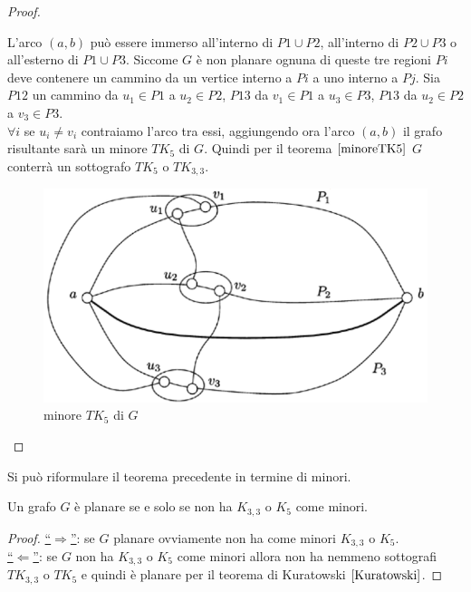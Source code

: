 \begin{teorema}
\begin{proof}
\begin{enumerate}
            L'arco \((a,b)\) può essere immerso all'interno di \(P1 \cup P2\), all'interno di \(P2 \cup P3\) o all'esterno di \(P1 \cup P3\). Siccome \(G\) è non planare ognuna di queste tre regioni \(Pi\) deve contenere un cammino da un vertice interno a \(Pi\) a uno interno a \(Pj\). Sia \(P12\) un cammino da \(u_1 \in P1\) a \(u_2 \in P2\), \(P13\) da \(v_1 \in P1\) a \(u_3 \in P3\), \(P13\) da \(u_2 \in P2\) a \(v_3 \in P3\).\\
            \(\forall i\) se \(u_i \neq v_i\) contraiamo l'arco tra essi, aggiungendo ora l'arco \((a,b)\) il grafo risultante sarà un minore \(TK_5\) di \(G\). Quindi per il teorema \(\ref{minoreTK5}\) \(G\) conterrà un sottografo \(TK_5\) o \(TK_{3,3}\).
            \begin{figure}[H]
                \centering
                \includegraphics[scale=0.6]{img/minoreTK5.PNG}
                \caption{minore \(TK_5\) di \(G\)}
            \end{figure}
        \end{enumerate}
    \end{proof}
\end{teorema}
\noindent Si può riformulare il teorema precedente in termine di minori.
\begin{teorema}
    Un grafo \(G\) è planare se e solo se non ha \(K_{3,3}\) o \(K_5\) come minori.
    \begin{proof}
        \underline{“\(\Rightarrow\)”}: se \(G\) planare ovviamente non ha come minori \(K_{3,3}\) o \(K_5\). \\
        \underline{“\(\Leftarrow\)”}: se \(G\) non ha \(K_{3,3}\) o \(K_5\) come minori allora non ha nemmeno sottografi \(TK_{3,3}\) o \(TK_5\) e quindi è planare per il teorema di Kuratowski \(\ref{Kuratowski}\).
    \end{proof}
\end{teorema}
